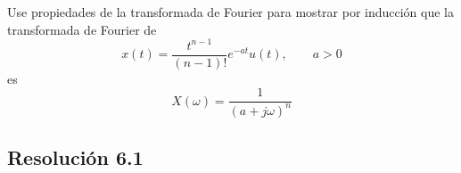 \documentclass[
  11pt,
  letterpaper,
   addpoints,
   answers
  ]{exam}
\begin{document}
\begin{questions}
%
%
%
%
%
%
%
%
\question 
Use propiedades de la transformada de Fourier para mostrar por inducción que la transformada de Fourier de
$$x(t) = \frac{t^{n-1}}{(n-1)!}e^{-at}u(t), \qquad a > 0$$
es
$$X(\omega) = \frac{1}{(a + j\omega)^n}$$

\begin{solution}
\subsection*{Resolución 6.1}


\end{solution}
\end{questions}
\end{document}
